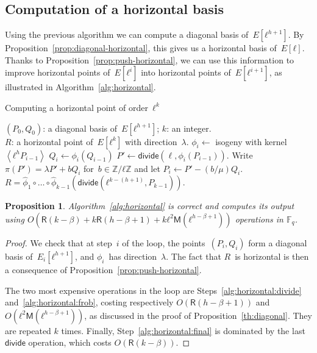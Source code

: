 \documentclass{lms}
\newtheorem{prop}[thm]{Proposition}
\def\chev#1{\left\langle#1\right\rangle}
\def\cout#1{\mathsf{#1}}
\def\sfdiv{\mathsf{divide}}
\newcommand{\F}{\mathbb{F}}
\newcommand{\MM}{\cout{M}}
\newcommand{\RR}{\cout{R}}
\begin{document}
\subsection{Computation of a horizontal basis}
\label{ss:horizontal}

Using the previous algorithm
we can compute a diagonal basis of~$E[ℓ^{h+1}]$.
By Proposition~\ref{prop:diagonal-horizontal},
this gives us a horizontal basis of~$E[ℓ]$.
Thanks to Proposition~\ref{prop:push-horizontal},
we can use this information to improve horizontal points of~$E[ℓ^i]$
into horizontal points of~$E[ℓ^{i+1}]$, as illustrated in
Algorithm~\ref{alg:horizontal}.

\begin{algorithm}
\caption{\label{alg:horizontal}Computing a horizontal point of order~$ℓ^k$}
\begin{algorithmic}[1]
\REQUIRE $(P_0, Q_0)$: a diagonal basis of~$E[ℓ^{h+1}]$; $k$: an integer.\\
\ENSURE $R$: a horizontal point of~$E[ℓ^k]$ with direction~$λ$.
\STATE $ϕ_i \gets $ isogeny with kernel~$\chev{ℓ^{h} P_{i-1}}$
\STATE $Q_{i} \gets ϕ_i(Q_{i-1})$
\STATE\label{alg:horizontal:divide} $P' \gets \sfdiv(\ell, ϕ_i(P_{i-1}))$.
\STATE\label{alg:horizontal:frob} Write~$π(P') = λ P' + b Q_i$ for~$b ∈ ℤ/ℓℤ$ and
let $P_{i} \gets P' - (b/μ) Q_i$.
\ENDFOR
\RETURN\label{alg:horizontal:final} $R = \widehat{ϕ}_1 ∘ … ∘ \widehat{ϕ}_{k-1}
  (\sfdiv( ℓ^{k-(h+1)}, P_{k-1}) )$. 
\end{algorithmic}
\end{algorithm}
\begin{prop}\label{th:horizontal}
  Algorithm~\ref{alg:horizontal} is correct and computes its output
  using $O(\RR(k-\beta) + k\RR(h-β+1) + kℓ^2\MM(ℓ^{h-β+1}))$
  operations in $\F_q$.
\end{prop}
\begin{proof}
We check that at step~$i$ of the loop,
the points~$(P_i, Q_i)$ form a diagonal basis of~$E_i[ℓ^{h+1}]$,
and $ϕ_i$~has direction~$λ$.
The fact that $R$~is horizontal is then a consequence
of Proposition~\ref{prop:push-horizontal}.

The two most expensive operations in the loop are
Steps~\ref{alg:horizontal:divide} and~\ref{alg:horizontal:frob},
costing respectively $O(\RR(h-β+1))$ and $O(ℓ^2\MM(ℓ^{h-β+1}))$, as
discussed in the proof of Proposition~\ref{th:diagonal}. They are
repeated $k$ times. Finally, Step~\ref{alg:horizontal:final} is
dominated by the last $\sfdiv$ operation, which costs $O(\RR(k-β))$.
\end{proof}
\end{document}
